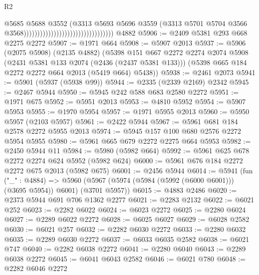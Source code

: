 \begin{lexlean}{R2}
\begin{coremodule}
                                                                  @5685
                                                                  @5688
                                                                  @3552
                                                                  (@3313
                                                                    @5693
                                                                    @5696
                                                                    @3559
                                                                    (@3313
                                                                      @5701
                                                                      @5704
                                                                      @3566
                                                                      @3568)))))))))))))))))))))))))))))))))
    @4882
@5906 := @2409 @5381 @293 @668 @2275 @2272
@5907 := @1971 @664
@5908 := @5907 @2013
@5937 := @5906
    (@2075 @5908)
    (@2135 @4882)
    (@5398
      @151
      @667
      @2272
      @2274
      @2074
      @5908
      (@2431 @5381 @133 @2074 (@2436 (@2437 @5381 @133)))
      (@5398 @665 @184 @2272 @2272 @664 @2013 (@5419 @664) @5438))
@5938 := @2461 @2073
@5941 := @5901 (@5937 (@5938 @99))
@5944 := @2335 (@2339 @2169) @2342
@5945 := @2467 @5944
@5950 := @5945 @242 @588 @683 @2580 @2272
@5951 := @1971 @675
@5952 := @5951 @2013
@5953 := @4810 @5952
@5954 := @5907 @5953
@5955 := @1970 @5954
@5957 := @1971 @5955 @2013
@5960 := @5950 @5957 (@2103 @5957)
@5961 := @2422 @5944
@5967 := @5961 @681 @184 @2578 @2272 @5955 @2013
@5974 := @5945 @157 @100 @680 @2576 @2272 @5954 @5955
@5980 := @5961 @665 @679 @2272 @2275 @664 @5953
@5982 := @2450 @5944 @11
@5984 := @5980 (@5982 @664)
@5992 := @5961 @625 @678 @2272 @2274 @624 @5952 (@5982 @624)
@6000 := @5961 @676 @184 @2272 @2272 @675 @2013 (@5982 @675)
@6001 := @2456 @5944
@6014 := @5941
    (fun ("_" : @4884) =>
    @5960 (@5967 (@5974 (@5984 (@5992 (@6000 @6001))) (@3695 @5954)) @6001) (@3701 @5957))
@6015 := @4883 @2486
@6020 := @2373 @5944 @691 @706 @1362 @2277
@6021 := @2283 @2132
@6022 := @6021 @252
@6023 := @2282 @6022
@6024 := @6023 @2272
@6025 := @2280 @6024
@6027 := @2289 @6022 @2272
@6028 := @6025 @6027
@6029 := @6028 @2582
@6030 := @6021 @257
@6032 := @2282 @6030 @2272
@6033 := @2280 @6032
@6035 := @2289 @6030 @2272
@6037 := @6033 @6035 @2582
@6038 := @6021 @747
@6040 := @2282 @6038 @2272
@6041 := @2280 @6040
@6043 := @2289 @6038 @2272
@6045 := @6041 @6043 @2582
@6046 := @6021 @780
@6048 := @2282 @6046 @2272

\end{coremodule}
\end{lexlean}
